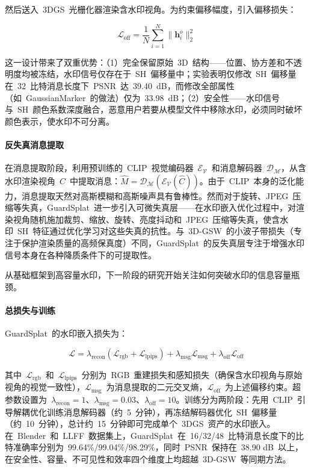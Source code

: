 然后送入~3DGS~光栅化器渲染含水印视角。为约束偏移幅度，引入偏移损失：

\begin{equation}
  \mathcal{L}_{\text{off}} = \frac{1}{N}\sum_{i=1}^{N}\|\boldsymbol{h}^o_i\|_2^2
\end{equation}

这一设计带来了双重优势：（1）完全保留原始~3D~结构——位置、协方差和不透明度均被冻结，水印信号仅存在于~SH~偏移量中；实验表明仅修改~SH~偏移量在~32~比特消息长度下~PSNR~达~39.40~dB，而修改全部属性（如~GaussianMarker~的做法）仅为~33.98~dB；（2）安全性——水印信号与~SH~颜色系数深度融合，恶意用户若要从模型文件中移除水印，必须同时破坏颜色表示，使水印不可分离。

\paragraph{反失真消息提取}
在消息提取阶段，利用预训练的~CLIP~视觉编码器~$\mathcal{E}_\mathcal{V}$~和消息解码器~$\mathcal{D}_\mathcal{M}$，从含水印渲染视角~$\hat{C}$~中提取消息：$\hat{M} = \mathcal{D}_\mathcal{M}(\mathcal{E}_\mathcal{V}(\hat{C}))$。由于~CLIP~本身的泛化能力，消息提取天然对高斯模糊和高斯噪声具有鲁棒性。然而对于旋转、JPEG~压缩等失真，GuardSplat~进一步引入可微失真层——在水印嵌入优化过程中，对渲染视角随机施加裁剪、缩放、旋转、亮度抖动和~JPEG~压缩等失真，使含水印~SH~特征通过优化学习对这些失真的抗性。与~3D-GSW~的小波子带损失（专注于保护渲染质量的高频保真度）不同，GuardSplat~的反失真层专注于增强水印信号本身在各种降质条件下的可提取性。

从基础框架到高容量水印，下一阶段的研究开始关注如何突破水印的信息容量瓶颈。

\paragraph{总损失与训练}
GuardSplat~的水印嵌入损失为：

\begin{equation}
  \mathcal{L} = \lambda_{\text{recon}}(\mathcal{L}_{\text{rgb}} + \mathcal{L}_{\text{lpips}}) + \lambda_{\text{msg}}\mathcal{L}_{\text{msg}} + \lambda_{\text{off}}\mathcal{L}_{\text{off}}
\end{equation}

其中~$\mathcal{L}_{\text{rgb}}$~和~$\mathcal{L}_{\text{lpips}}$~分别为~RGB~重建损失和感知损失（确保含水印视角与原始视角的视觉一致性），$\mathcal{L}_{\text{msg}}$~为消息提取的二元交叉熵，$\mathcal{L}_{\text{off}}$~为上述偏移约束。超参数设置为~$\lambda_{\text{recon}} = 1$、$\lambda_{\text{msg}} = 0.03$、$\lambda_{\text{off}} = 10$。训练分为两阶段：先用~CLIP~引导解耦优化训练消息解码器（约~5~分钟），再冻结解码器优化~SH~偏移量（约~10~分钟），总计约~15~分钟即可完成单个~3DGS~资产的水印嵌入。在~Blender~和~LLFF~数据集上，GuardSplat~在~16/32/48~比特消息长度下的比特准确率分别为~99.64\%/99.04\%/98.29\%，同时~PSNR~保持在~38.90 dB~以上，在安全性、容量、不可见性和效率四个维度上均超越~3D-GSW~等同期方法。

